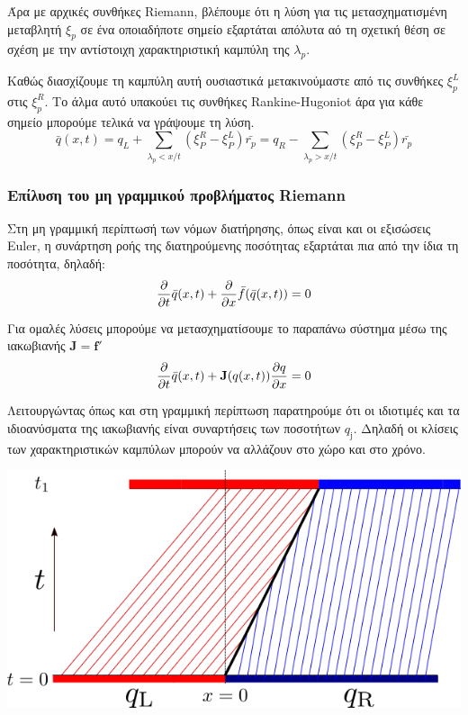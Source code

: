 Άρα με αρχικές συνθήκες Riemann, βλέπουμε ότι η λύση για τις μετασχηματισμένη μεταβλητή $\xi _p$ σε ένα οποιαδήποτε σημείο εξαρτάται απόλυτα αό τη σχετική θέση σε σχέση με την αντίστοιχη χαρακτηριστική καμπύλη της $\lambda _p$.  

Καθώς διασχίζουμε τη καμπύλη αυτή ουσιαστικά μετακινούμαστε από τις συνθήκες $\xi^L_p$ στις $\xi^R_p$. Το άλμα αυτό υπακούει τις συνθήκες Rankine-Hugoniot  άρα για κάθε σημείο μπορούμε τελικά να γράψουμε τη λύση.
\begin{equation}
\bar{q}(x,t)=q_L + \sum_{\lambda_p<x/t} (\xi ^R_P - \xi ^L_P) \bar{r_p}
			=q_R - \sum_{\lambda_p>x/t} (\xi ^R_P - \xi ^L_P) \bar{r_p}
\end{equation}

\subsubsection{Επίλυση του μη γραμμικού προβλήματος Riemann}
Στη μη γραμμική περίπτωσή των νόμων διατήρησης, όπως είναι και οι εξισώσεις Euler, η συνάρτηση ροής της διατηρούμενης ποσότητας εξαρτάται πια από την ίδια τη ποσότητα, δηλαδή:
\begin{equation}
\pdv{t} \bar{q}(x,t) + \pdv{x} \bar{f}(\bar{q}(x,t)) = 0 
\end{equation}

Για ομαλές λύσεις μπορούμε να μετασχηματίσουμε το παραπάνω σύστημα μέσω της ιακωβιανής $\mathbf{J} =\mathbf{f}'$
\begin{equation}
\pdv{t} \bar{q}(x,t) + \mathbf{J}(q(x,t)) \pdv{q}{x}  = 0 
\end{equation}

Λειτουργώντας όπως και στη γραμμική περίπτωση παρατηρούμε ότι οι ιδιοτιμές και τα ιδιοανύσματα της ιακωβιανής είναι συναρτήσεις των ποσοτήτων $q_\mathrm{j}$. Δηλαδή οι κλίσεις των χαρακτηριστικών καμπύλων μπορούν να αλλάζουν στο χώρο και στο χρόνο. 

\begin{marginfigure}
	\centering
	\includegraphics[width=1\linewidth]{Images/shockwave}
	\caption{}
	\label{fig:shockwave}
\end{marginfigure}


